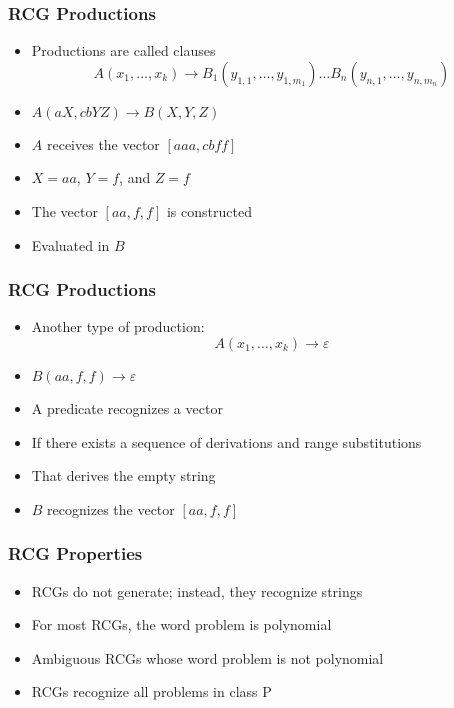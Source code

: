 \documentclass{beamer}
\begin{document}
\begin{frame}
    \frametitle{RCG Productions}

    \begin{itemize}
        \item Productions are called clauses
              \[
                  A(x_1, \ldots, x_k) \to B_1(y_{1,1}, \ldots, y_{1,m_1}) \ldots B_n(y_{n,1}, \ldots, y_{n,m_n})
              \]
              \pause
        \item $A(aX,cbYZ)\to B(X,Y,Z)$
              \pause
        \item $A$ receives the vector $[aaa,cbff]$
              \pause
        \item $X=aa$, $Y=f$, and $Z=f$
              \pause
        \item The vector $[aa,f,f]$ is constructed
              \pause
        \item Evaluated in $B$
    \end{itemize}
\end{frame}

\begin{frame}
    \frametitle{RCG Productions}

    \begin{itemize}
        \item Another type of production:
              $$A(x_1, \ldots, x_k) \to \varepsilon$$
              \pause
        \item $B(aa,f,f)\to \varepsilon$
              \pause
        \item A predicate recognizes a vector
              \pause
        \item If there exists a sequence of derivations and range substitutions
              \pause
        \item That derives the empty string
              \pause
        \item $B$ recognizes the vector $[aa,f,f]$
    \end{itemize}
\end{frame}

\begin{frame}
    \frametitle{RCG Properties}

    \begin{itemize}
        \item RCGs do not generate; instead, they recognize strings
              \pause
        \item For most RCGs, the word problem is polynomial
              \pause
        \item Ambiguous RCGs whose word problem is not polynomial
              \pause
        \item RCGs recognize all problems in class P
    \end{itemize}
\end{frame}
\end{document}
